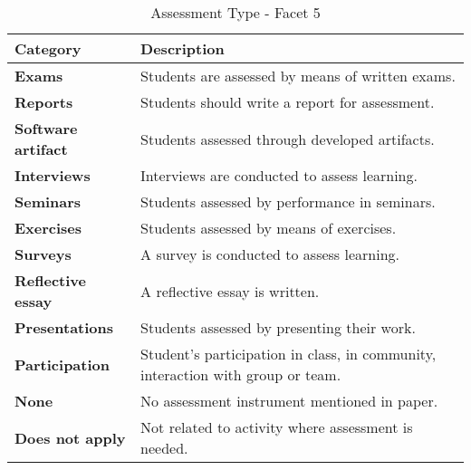 \begin{table}[hbt]
\centering
\caption {Assessment Type - Facet 5}
   \vspace{-0.25cm}
   \begin{small}
   {\begin{tabular}{l|p{2.25in}}
		\bf Category & \bf Description \\ \hline
			\bf Exams & Students are assessed by means of written exams. \\
			\bf Reports & Students should write a report for assessment. \\
		    \bf Software artifact & Students assessed through developed artifacts. \\
			\bf Interviews & Interviews are conducted to assess learning. \\
			\bf Seminars & Students assessed by performance in seminars. \\
			\bf Exercises & Students assessed by means of exercises. \\
			\bf Surveys & A survey is conducted to assess learning. \\
			\bf Reflective essay & A reflective essay is written. \\
			\bf Presentations & Students assessed by presenting their work. \\
			\bf Participation & Student's participation in class, in community, interaction with group or team. \\
			\bf None & No assessment instrument mentioned in paper. \\
			\bf Does not apply & Not related to activity where assessment is needed. \\

		\end{tabular}} \label{tab:assessmentType}
        \end{small}
\end{table}
